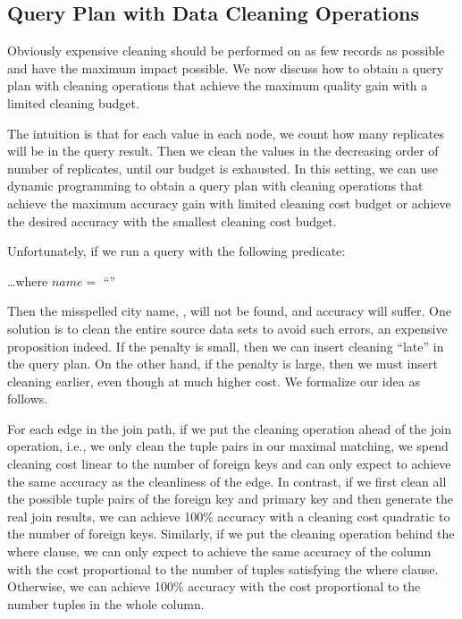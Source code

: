 



\subsection{Query Plan with Data Cleaning Operations}
\label{subsec:gain}

Obviously expensive cleaning should be performed on as few records as possible and have the maximum impact possible. We now discuss how to obtain a query plan with cleaning operations that achieve the maximum quality gain with a limited cleaning budget. 

The intuition is that for each value in each node, we count how many replicates  will be in the query result. Then we clean the values in the decreasing order of number of replicates, until our budget is exhausted.  In this setting, we can use dynamic programming to obtain a query plan with cleaning operations that achieve the maximum accuracy gain with limited cleaning cost budget or achieve the desired accuracy with the smallest cleaning cost budget. 


\iffalse
Unfortunately, if we run a query with the following predicate:

\vspace{.5em}
\dots \textsf{where} $name = $ ``''
\vspace{.5em}

\noindent Then the misspelled city name,  \ie {}, will not be found, and accuracy will suffer. One solution is to clean the entire source data sets to avoid such errors, an expensive proposition indeed. If the penalty is small, then we can insert cleaning ``late'' in the query plan. On the other hand, if the penalty is large, then we must insert cleaning earlier, even though at much higher cost. We formalize our idea as follows.


For each edge in the join path, if we put the cleaning operation ahead of the join operation, i.e., we only clean the tuple pairs in our maximal matching, we spend cleaning cost linear to the number of foreign keys and can only expect to achieve the same accuracy  as the cleanliness of the edge. In contrast, if we first clean all the possible tuple pairs of the foreign key and primary key and then generate the real join results, we can achieve 100\% accuracy with a cleaning cost quadratic to the number of foreign keys. Similarly, if we put the cleaning operation behind the where clause, we can only expect to achieve the same accuracy of the column with the cost proportional to the number of tuples satisfying the where clause. Otherwise, we can achieve 100\% accuracy with the cost proportional to the number tuples in the whole column.


